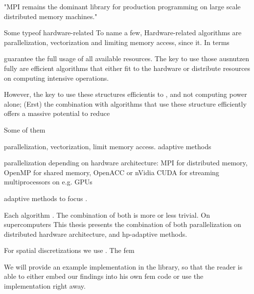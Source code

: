 "MPI remains the dominant library for production programming on large scale distributed memory machines."

Some typeof hardware-related 
To name a few, Hardware-related algorithms are parallelization, vectorization and limiting memory access, since it. In terms 


guarantee the full usage of all available resources. The key to use those ausnutzen fully are efficient algorithms that either fit to the hardware or distribute resources on computing intensive operations.

However, the key to use these structures efficientis to , and not computing power alone; (Erst) the combination with algorithms that use these structure efficiently offers a massive potential to reduce 




Some of them

parallelization, vectorization, limit memory access. adaptive methods

parallelization depending on hardware architecture: MPI for distributed memory, OpenMP for shared memory, OpenACC or nVidia CUDA for streaming multiprocessors on e.g. GPUs

adaptive methods to focus .


Each algorithm . The combination of both is more or less trivial.
On supercomputers
This thesis presents the combination of both parallelization on distributed hardware architecture, and hp-adaptive methods.

For spatial discretizations we use . The \gls{fem}


We will provide an example implementation in the \dealii{} library, so that the reader is able to either embed our findings into his own \gls{fem} code or use the \dealii{} implementation right away.